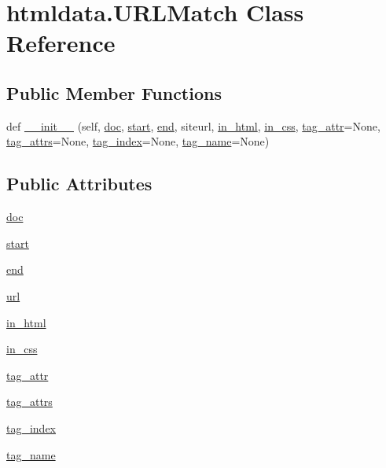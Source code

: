\hypertarget{classhtmldata_1_1_u_r_l_match}{}\section{htmldata.\+U\+R\+L\+Match Class Reference}
\label{classhtmldata_1_1_u_r_l_match}
\subsection*{Public Member Functions}
\begin{DoxyCompactItemize}
\item 
def \hyperlink{classhtmldata_1_1_u_r_l_match_aa83f2bc416573c219d8e8f2527487e28}{\+\_\+\+\_\+init\+\_\+\+\_\+} (self, \hyperlink{classhtmldata_1_1_u_r_l_match_a028aae38af0861faeb5ae6a90eee78ab}{doc}, \hyperlink{classhtmldata_1_1_u_r_l_match_add3f92d5bf1a1ca97fa3c5d677ef995d}{start}, \hyperlink{classhtmldata_1_1_u_r_l_match_a5d79be2cb7e35c036f0d0647de97d57a}{end}, siteurl, \hyperlink{classhtmldata_1_1_u_r_l_match_a328ec96bba817f01f108e277e3d80909}{in\+\_\+html}, \hyperlink{classhtmldata_1_1_u_r_l_match_a28d1ab9f5caf5da8cb6cb4afa798fe48}{in\+\_\+css}, \hyperlink{classhtmldata_1_1_u_r_l_match_ac4d6a7c7e33a3e491f458b25e46b0f5f}{tag\+\_\+attr}=None, \hyperlink{classhtmldata_1_1_u_r_l_match_a23da6e7555d355c1956305e478b41abc}{tag\+\_\+attrs}=None, \hyperlink{classhtmldata_1_1_u_r_l_match_a3937821632a09ff7dba0a0faa9ac6732}{tag\+\_\+index}=None, \hyperlink{classhtmldata_1_1_u_r_l_match_a29bcaf66b99584041682125ce9c84b0a}{tag\+\_\+name}=None)
\end{DoxyCompactItemize}
\subsection*{Public Attributes}
\begin{DoxyCompactItemize}
\item 
\hyperlink{classhtmldata_1_1_u_r_l_match_a028aae38af0861faeb5ae6a90eee78ab}{doc}
\item 
\hyperlink{classhtmldata_1_1_u_r_l_match_add3f92d5bf1a1ca97fa3c5d677ef995d}{start}
\item 
\hyperlink{classhtmldata_1_1_u_r_l_match_a5d79be2cb7e35c036f0d0647de97d57a}{end}
\item 
\hyperlink{classhtmldata_1_1_u_r_l_match_a5923f37f0b8b27fc79b2c91a2d9e919f}{url}
\item 
\hyperlink{classhtmldata_1_1_u_r_l_match_a328ec96bba817f01f108e277e3d80909}{in\+\_\+html}
\item 
\hyperlink{classhtmldata_1_1_u_r_l_match_a28d1ab9f5caf5da8cb6cb4afa798fe48}{in\+\_\+css}
\item 
\hyperlink{classhtmldata_1_1_u_r_l_match_ac4d6a7c7e33a3e491f458b25e46b0f5f}{tag\+\_\+attr}
\item 
\hyperlink{classhtmldata_1_1_u_r_l_match_a23da6e7555d355c1956305e478b41abc}{tag\+\_\+attrs}
\item 
\hyperlink{classhtmldata_1_1_u_r_l_match_a3937821632a09ff7dba0a0faa9ac6732}{tag\+\_\+index}
\item 
\hyperlink{classhtmldata_1_1_u_r_l_match_a29bcaf66b99584041682125ce9c84b0a}{tag\+\_\+name}
\end{DoxyCompactItemize}



